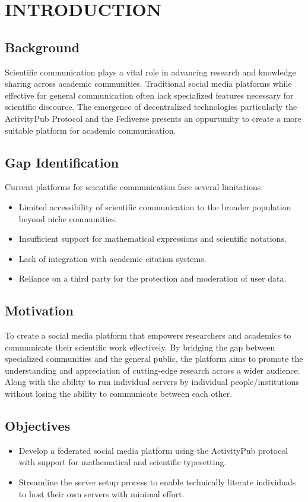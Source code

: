 \chapter{INTRODUCTION}
\section{Background}
Scientific communication plays a vital role in advancing research and knowledge sharing across academic communities. Traditional social media platforms while effective for general communication often lack specialized features necessary for scientific discource. The emergence of decentralized technologies particularly the ActivityPub \cite{ActivityPub} Protocol and the Fediverse presents an oppurtunity to create a more suitable platform for academic communication. 
\section{Gap Identification}
Current platforms for scientific communication face several limitations:

\begin{itemize}
  \item Limited accessibility of scientific communication to the broader population beyond niche communities.
  \item Insufficient support for mathematical expressions and scientific notations.
  \item Lack of integration with academic citation systems.
  \item Reliance on a third party for the protection and moderation of user data.
\end{itemize}

\section{Motivation}
To create a social media platform that empowers researchers and academics to communicate their scientific work effectively. By bridging the gap between specialized communities and the general public, the platform aims to promote the understanding and appreciation of cutting-edge research across a wider audience. Along with the ability to run individual servers by individual people/institutions without losing the ability to communicate between each other.

\section{Objectives}
\begin{itemize}
  \item Develop a federated social media platform using the ActivityPub protocol with support for mathematical and scientific typesetting.
  \item Streamline the server setup process to enable technically literate individuals to host their own servers with minimal effort.
\end{itemize}
